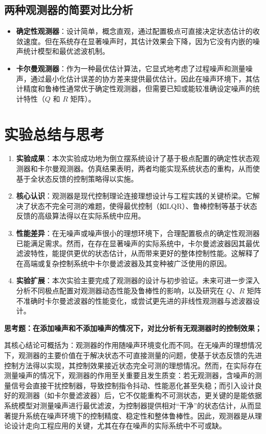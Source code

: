 \documentclass[a4paper, 12pt]{ctexart}
\begin{document}
\subsection{两种观测器的简要对比分析}
\begin{itemize}
    \item \textbf{确定性观测器}：设计简单，概念直观，通过配置极点可直接决定状态估计的收敛速度。但在系统存在显著噪声时，其估计效果会下降，因为它没有内嵌的噪声统计模型和最优滤波机制。
    \item \textbf{卡尔曼观测器}：作为一种最优估计算法，它显式地考虑了过程噪声和测量噪声，通过最小化估计误差的协方差来提供最优估计。因此在噪声环境下，其估计精度和鲁棒性通常优于确定性观测器，但需要已知或能较准确设定噪声的统计特性（$Q$ 和 $R$ 矩阵）。
\end{itemize}

\section{实验总结与思考}
\begin{enumerate}
    \item \textbf{实验成果}：本次实验成功地为倒立摆系统设计了基于极点配置的确定性状态观测器和卡尔曼观测器。仿真结果表明，两者均能实现系统状态的重构，从而使基于全状态反馈的控制策略得以实施。
    \item \textbf{核心认识}：观测器是现代控制理论连接理想设计与工程实践的关键桥梁。它解决了状态不完全可测的难题，使得最优控制（如LQR）、鲁棒控制等基于状态反馈的高级算法得以在实际系统中应用。
    \item \textbf{性能差异}：在无噪声或噪声很小的理想环境下，合理配置极点的确定性观测器已能满足需求。然而，在存在显著噪声的实际系统中，卡尔曼滤波器因其最优滤波特性，能提供更优的状态估计，从而带来更好的整体控制性能。这解释了在高端或复杂控制系统中卡尔曼滤波器及其变种被广泛使用的原因。
    \item \textbf{实验扩展}：本次实验主要完成了观测器的设计与初步验证。未来可进一步深入分析不同极点配置对观测器动态性能及鲁棒性的影响，以及研究在 $Q$、$R$ 矩阵不准确时卡尔曼滤波器的性能变化，或尝试更先进的非线性观测器与滤波器设计。
\end{enumerate}

\vspace{1em}
\noindent\textbf{思考题：在添加噪声和不添加噪声的情况下，对比分析有无观测器时的控制效果；}

\noindent 其核心结论可概括为：观测器的作用随噪声环境变化而不同。在无噪声的理想情况下，观测器的主要价值在于解决状态不可直接测量的问题，使基于状态反馈的先进控制方法得以实现，其控制效果接近状态完全可测的理想情况。然而，在实际存在测量噪声的情况下，观测器的作用至关重要且发生质变：若无观测器，含噪声的测量信号会直接干扰控制器，导致控制指令抖动、性能恶化甚至失稳；而引入设计良好的观测器（如卡尔曼滤波器）后，它不仅能重构不可测状态，更关键的是能依据系统模型对测量噪声进行最优滤波，为控制器提供相对“干净”的状态估计，从而显著提升系统在噪声环境下的控制精度、稳定性和整体鲁棒性。因此，观测器是从理论设计走向工程应用的关键，尤其在存在噪声的实际系统中不可或缺。
\end{document}
